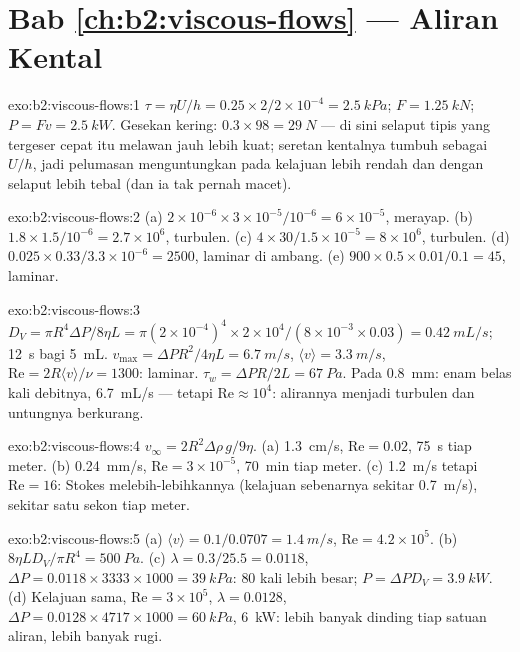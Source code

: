 \section*{Bab \ref{ch:b2:viscous-flows} --- Aliran Kental}

\begin{solution}{exo:b2:viscous-flows:1}
$\tau = \eta U/h = 0.25 \times 2/2 \times 10^{-4} = \qty{2.5}{kPa}$; $F = \qty{1.25}{kN}$;
$P = Fv = \qty{2.5}{kW}$. Gesekan kering: $0.3 \times 98 = \qty{29}{N}$ --- di sini
selaput tipis yang tergeser cepat itu melawan jauh lebih kuat; seretan kentalnya tumbuh sebagai
$U/h$, jadi pelumasan menguntungkan pada kelajuan lebih rendah dan dengan selaput lebih tebal (dan
ia tak pernah macet).
\end{solution}

\begin{solution}{exo:b2:viscous-flows:2}
(a) $2 \times 10^{-6} \times 3 \times 10^{-5}/10^{-6} = 6 \times 10^{-5}$, merayap. (b)
$1.8 \times 1.5/10^{-6} = 2.7 \times 10^6$, turbulen. (c) $4 \times 30/1.5 \times 10^{-5}
= 8 \times 10^6$, turbulen. (d) $0.025 \times 0.33/3.3 \times 10^{-6} = 2500$,
laminar di ambang. (e) $900 \times 0.5 \times 0.01/0.1 = 45$, laminar.
\end{solution}

\begin{solution}{exo:b2:viscous-flows:3}
$D_V = \pi R^4\Delta P/8\eta L = \pi(2 \times 10^{-4})^4 \times 2 \times 10^4/(8 \times 10^{-3}
\times 0.03) = \qty{0.42}{mL/s}$; \qty{12}{s} bagi \qty{5}{mL}. $v_{\max} = \Delta PR^2/
4\eta L = \qty{6.7}{m/s}$, $\langle v\rangle = \qty{3.3}{m/s}$, $\mathrm{Re} = 2R\langle v
\rangle/\nu = 1300$: laminar. $\tau_w = \Delta PR/2L = \qty{67}{Pa}$. Pada \qty{0.8}{mm}:
enam belas kali debitnya, \qty{6.7}{mL/s} --- tetapi $\mathrm{Re} \approx 10^4$: alirannya
menjadi turbulen dan untungnya berkurang.
\end{solution}

\begin{solution}{exo:b2:viscous-flows:4}
$v_\infty = 2R^2\Delta\rho\,g/9\eta$. (a) \qty{1.3}{cm/s}, $\mathrm{Re} = 0.02$, \qty{75}{s}
tiap meter. (b) \qty{0.24}{mm/s}, $\mathrm{Re} = 3 \times 10^{-5}$, \qty{70}{min} tiap
meter. (c) \qty{1.2}{m/s} tetapi $\mathrm{Re} = 16$: Stokes melebih-lebihkannya (kelajuan
sebenarnya sekitar \qty{0.7}{m/s}), sekitar satu sekon tiap meter.
\end{solution}

\begin{solution}{exo:b2:viscous-flows:5}
(a) $\langle v\rangle = 0.1/0.0707 = \qty{1.4}{m/s}$, $\mathrm{Re} = 4.2 \times 10^5$. (b)
$8\eta LD_V/\pi R^4 = \qty{500}{Pa}$. (c) $\lambda = 0.3/25.5 = 0.0118$, $\Delta P = 0.0118
\times 3333 \times 1000 = \qty{39}{kPa}$: $80$ kali lebih besar; $P = \Delta PD_V = \qty{3.9}{kW}$.
(d) Kelajuan sama, $\mathrm{Re} = 3 \times 10^5$, $\lambda = 0.0128$, $\Delta P = 0.0128 \times 4717
\times 1000 = \qty{60}{kPa}$, \qty{6}{kW}: lebih banyak dinding tiap satuan aliran, lebih banyak rugi.
\end{solution}


